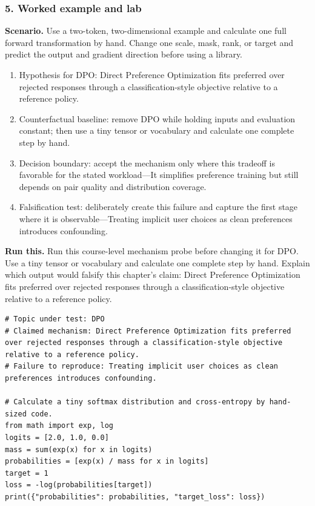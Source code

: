 \subsubsection*{5. Worked example and lab}
\textbf{Scenario.} Use a two-token, two-dimensional example and calculate one full forward transformation by hand. Change one scale, mask, rank, or target and predict the output and gradient direction before using a library.
\begin{enumerate}
\item Hypothesis for DPO: Direct Preference Optimization fits preferred over rejected responses through a classification-style objective relative to a reference policy.
\item Counterfactual baseline: remove DPO while holding inputs and evaluation constant; then use a tiny tensor or vocabulary and calculate one complete step by hand.
\item Decision boundary: accept the mechanism only where this tradeoff is favorable for the stated workload—It simplifies preference training but still depends on pair quality and distribution coverage.
\item Falsification test: deliberately create this failure and capture the first stage where it is observable—Treating implicit user choices as clean preferences introduces confounding.
\end{enumerate}
\textbf{Run this.} Run this course-level mechanism probe before changing it for DPO. Use a tiny tensor or vocabulary and calculate one complete step by hand. Explain which output would falsify this chapter's claim: Direct Preference Optimization fits preferred over rejected responses through a classification-style objective relative to a reference policy.
\begin{Verbatim}[fontsize=\scriptsize]
# Topic under test: DPO
# Claimed mechanism: Direct Preference Optimization fits preferred over rejected responses through a classification-style objective relative to a reference policy.
# Failure to reproduce: Treating implicit user choices as clean preferences introduces confounding.

# Calculate a tiny softmax distribution and cross-entropy by hand-sized code.
from math import exp, log
logits = [2.0, 1.0, 0.0]
mass = sum(exp(x) for x in logits)
probabilities = [exp(x) / mass for x in logits]
target = 1
loss = -log(probabilities[target])
print({"probabilities": probabilities, "target_loss": loss})
\end{Verbatim}
